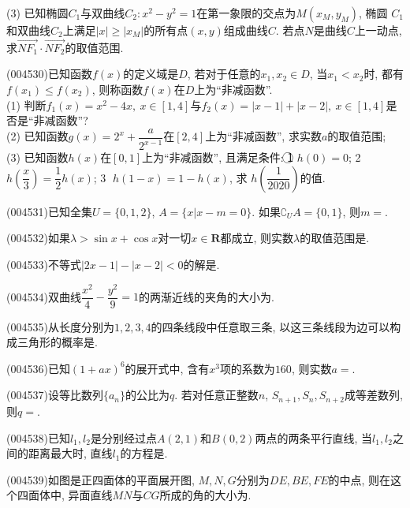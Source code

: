 (3) 已知椭圆$C_1$与双曲线$C_2:x^2-y^2=1$在第一象限的交点为$M(x_M,y_M)$, 椭圆 $C_1$和双曲线$C_2$上满足$|x|\ge |x_M|$的所有点$(x,y)$组成曲线$C$. 若点$N$是曲线$C$上一动点, 求$\overrightarrow{NF_1}\cdot \overrightarrow{NF_2}$的取值范围.
\item (004530)已知函数$f(x)$的定义域是$D$, 若对于任意的$x_1,x_2\in D$, 当$x_1<x_2$时, 都有$f(x_1)\le f(x_2)$, 则称函数$f(x)$在$D$上为``非减函数''.\\
(1) 判断$f_1(x)=x^2-4x, \ x\in [1,4]$与$f_2(x)=|x-1|+|x-2|, \ x\in [1,4]$是否是``非减函数''?\\
(2) 已知函数$g(x)=2^x+\dfrac a{2^{x-1}}$在$[2,4]$上为``非减函数'', 求实数$a$的取值范围;\\
(3) 已知函数$h(x)$在$[0,1]$上为``非减函数'', 且满足条件:
\textcircled{1}  $h(0)=0$; \textcircled{2}  $h(\dfrac x3)=\dfrac 12h(x)$; \textcircled{3}  $h(1-x)=1-h(x)$, 求 $h(\dfrac 1{2020})$的值.
\item (004531)已知全集$U=\{0,1,2\}$, $A=\{x|x-m=0\}$. 如果$\complement_U A=\{0,1\}$, 则$m=$.
\item (004532)如果$\lambda>\sin x+\cos x$对一切$x\in\mathbf{R}$都成立, 则实数$\lambda$的取值范围是.
\item (004533)不等式$|2x-1|-|x-2|<0$的解是.
\item (004534)双曲线$\dfrac{x^2}4-\dfrac{y^2}9=1$的两渐近线的夹角的大小为.
\item (004535)从长度分别为$1,2,3,4$的四条线段中任意取三条, 以这三条线段为边可以构成三角形的概率是.
\item (004536)已知$(1+ax)^6$的展开式中, 含有$x^3$项的系数为$160$, 则实数$a=$.
\item (004537)设等比数列$\{a_n\}$的公比为$q$. 若对任意正整数$n$, $S_{n+1},S_n,S_{n+2}$成等差数列, 则$q=$.
\item (004538)已知$l_1,l_2$是分别经过点$A(2,1)$和$B(0,2)$两点的两条平行直线, 当$l_1,l_2$之间的距离最大时, 直线$l_1$的方程是.
\item (004539)如图是正四面体的平面展开图, $M,N,G$分别为$DE,BE,FE$的中点, 则在这个四面体中, 异面直线$MN$与$CG$所成的角的大小为.
\begin{center}
\end{center}
